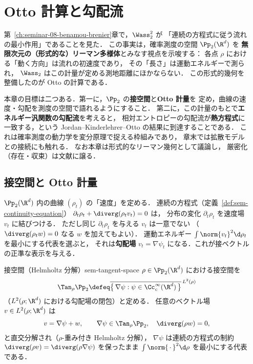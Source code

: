 \chapter{Otto 計算と勾配流}
\label{ch:seminar-09-otto}

第~\ref{ch:seminar-08-benamou-brenier}章で，$\Wass_2^2$ が
「連続の方程式に従う流れの最小作用」であることを見た．
この事実は，確率測度の空間 $\Pp_2(\R^d)$ を
\textbf{無限次元の（形式的な）リーマン多様体}とみなす視点を示唆する：
各点 $\rho$ における「動く方向」は流れの初速度であり，
その「長さ」は運動エネルギーで測られ，
$\Wass_2$ はこの計量が定める測地距離にほかならない．
この形式的幾何を整備したのが Otto の計算である．

本章の目標は二つある．第一に，$\Pp_2$ の\textbf{接空間}と\textbf{Otto 計量}を
定め，曲線の速度・勾配を測度の空間で語れるようにすること．
第二に，この計量のもとで\textbf{エネルギー汎関数の勾配流}を考えると，
相対エントロピーの勾配流が\textbf{熱方程式}に一致する，という
Jordan--Kinderlehrer--Otto の結果に到達することである．
これは確率測度の動力学を変分原理で捉える枠組みであり，
章末では拡散モデルとの接続にも触れる．
なお本章は形式的なリーマン幾何として議論し，
厳密化（存在・収束）は文献に譲る．

\section{接空間と Otto 計量}
\label{sec:sem-otto-metric}

$\Pp_2(\R^d)$ 内の曲線 $(\rho_t)$ の「速度」を定める．
連続の方程式（定義~\ref{def:sem-continuity-equation}）
$\partial_t\rho_t+\diverg(\rho_t v_t)=0$ は，
分布の変化 $\partial_t\rho_t$ を速度場 $v_t$ に結びつける．
ただし同じ $\partial_t\rho_t$ を与える $v_t$ は一意でない
（$\diverg(\rho_t w)=0$ なる $w$ を加えてもよい）．
運動エネルギー $\int\norm{v_t}^2\d\rho_t$ を最小にする代表を選ぶと，
それは\textbf{勾配場} $v_t=\nabla\psi_t$ になる．これが接ベクトルの正準な表示を与える．

\begin{claim}{接空間（Helmholtz 分解）}{sem-tangent-space}
  $\rho\in\Pp_2(\R^d)$ における接空間を
  \[
    \Tan_\rho\Pp_2
    \defeq \overline{\bigl\{\,\nabla\psi : \psi\in\Cc_c^\infty(\R^d)\,\bigr\}}^{\,L^2(\rho)}
  \]
  （$L^2(\rho;\R^d)$ における勾配場の閉包）と定める．
  任意のベクトル場 $v\in L^2(\rho;\R^d)$ は
  \[
    v = \nabla\psi + w,
    \qquad \nabla\psi\in\Tan_\rho\Pp_2,\quad \diverg(\rho w)=0,
  \]
  と直交分解され（$\rho$-重み付き Helmholtz 分解），
  $\nabla\psi$ は連続の方程式の制約
  $\diverg(\rho v)=\diverg(\rho\nabla\psi)$ を保ったまま
  $\int\norm{\,\cdot\,}^2\d\rho$ を最小にする代表である．
\end{claim}

